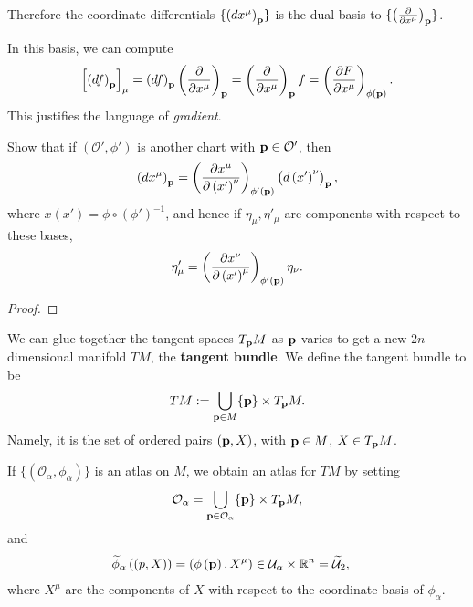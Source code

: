 Therefore the coordinate differentials $\{\left( d x^{\mu} \right)_{\vb{p}}\} $ is the dual basis to $\{ \left( \pdv{x^{\mu}} \right)_{\vb{p}} \}$.

In this basis, we can compute
\begin{align}
    \left[ \left( d f \right)_{\vb{p}} \right]_{\mu} = \left( df \right)_{\vb{p}} \left( \pdv{x^{\mu}} \right)_{\vb{p}} = \left( \pdv{x^{\mu}} \right)_{\vb{p}} f = \left( \pdv{F}{x^{\mu}} \right)_{\phi \left( \vb{p} \right) }   
.\end{align}
This justifies the language of \textit{gradient}.

\begin{exercise}
    Show that if $\left( \mathcal{O}', \phi'\right) $ is another chart with $\vb{p} \in \mathcal{O}'$, then
    \begin{align}
        \left( d x^{\mu}\right)_{\vb{p}} = \left( \pdv{x^{\mu}}{\left( x' \right) ^{\nu}} \right)_{\phi' \left( \vb{p} \right) } \left( d \left( x' \right)^{\nu} \right)_{\vb{p}} 
    ,\end{align}
    where $x \left( x' \right) = \phi \circ \left( \phi' \right)^{-1}$, and hence if $\eta_\mu, \eta'_\mu$ are components with respect to these bases,
    \begin{align}
        \eta'_{\mu} = \left( \pdv{x^{\nu}}{\left( x' \right)^{\mu}} \right)_{\phi' \left( \vb{p} \right) } \eta_\nu
    .\end{align}
\end{exercise}

\begin{proof}
    
\end{proof}

\begin{definition}
    We can glue together the tangent spaces $T_{\vb{p}}M$ as $\vb{p}$ varies to get a new $2n$ dimensional manifold $TM$, the \textbf{tangent bundle}. We define the tangent bundle to be
    \begin{align}
        TM := \bigcup_{\vb{p}\in M} \{\vb{p}\} \times T_{\vb{p}} M
    .\end{align}
    Namely, it is the set of ordered pairs $\left( \vb{p}, X \right) $, with $\vb{p} \in M$, $X \in T_{\vb{p}}M$.
\end{definition}

If $\{ \left( \mathcal{O}_\alpha, \phi_\alpha \right) \} $ is an atlas on $M$, we obtain an atlas for $TM$ by setting
\begin{align}
    \mathcal{O}_\alpha = \bigcup_{\vb{p} \in \mathcal{O}_\alpha} \{\vb{p}\} \times T_{\vb{p}} M
,\end{align}
and 
\begin{align}
    \widetilde{\phi}_\alpha \left( \left( p, X \right)  \right) &=  \left( \phi \left( \vb{p} \right) , X^{\mu} \right) \in \mathcal{U}_{\alpha} \times \mathbb{R}^{n} = \widetilde{\mathcal{U}}_2 
,\end{align}
where $X^{\mu}$ are the components of $X$ with respect to the coordinate basis of $\phi_\alpha$.

